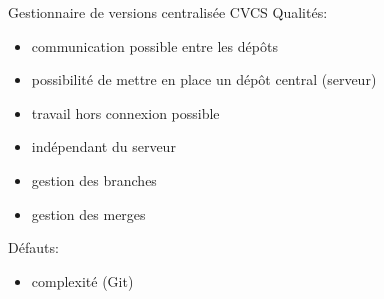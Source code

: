 \begin{frame}{Gestionnaire de versions centralisée CVCS}
  Qualités:
  \begin{itemize}
    \item{communication possible entre les dépôts}
    \item{possibilité de mettre en place un dépôt central (serveur)}
    \item{travail hors connexion possible}
    \item{indépendant du serveur}
    \item{gestion des branches}
    \item{gestion des merges}
  \end{itemize}

  Défauts:
  \begin{itemize}
    \item{complexité (Git)}
  \end{itemize}
\end{frame}
